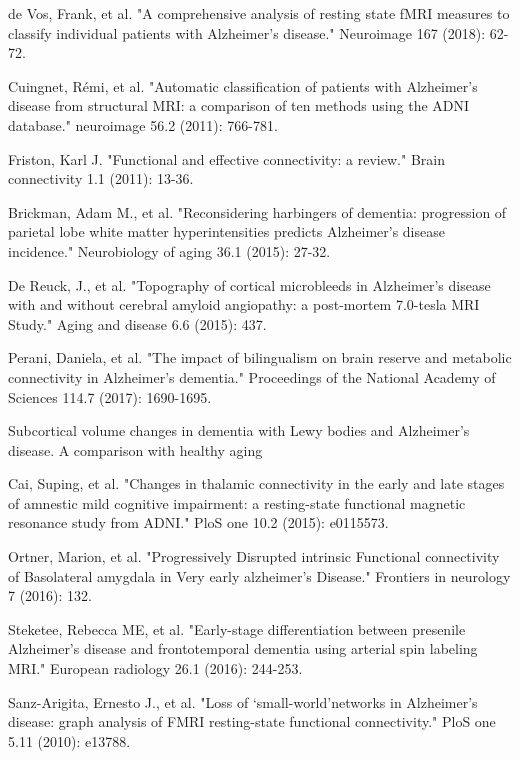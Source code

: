 \documentclass[preprint,12pt]{elsarticle}
\begin{document}
\begin{thebibliography}{1}
			de Vos, Frank, et al. "A comprehensive analysis of resting state fMRI measures to classify individual patients with Alzheimer's disease." Neuroimage 167 (2018): 62-72.
			
			Cuingnet, Rémi, et al. "Automatic classification of patients with Alzheimer's disease from structural MRI: a comparison of ten methods using the ADNI database." neuroimage 56.2 (2011): 766-781.
			
			Friston, Karl J. "Functional and effective connectivity: a review." Brain connectivity 1.1 (2011): 13-36.
			
			
			Brickman, Adam M., et al. "Reconsidering harbingers of dementia: progression of parietal lobe white matter hyperintensities predicts Alzheimer's disease incidence." Neurobiology of aging 36.1 (2015): 27-32.
			
			De Reuck, J., et al. "Topography of cortical microbleeds in Alzheimer’s disease with and without cerebral amyloid angiopathy: a post-mortem 7.0-tesla MRI Study." Aging and disease 6.6 (2015): 437.
			
			Perani, Daniela, et al. "The impact of bilingualism on brain reserve and metabolic connectivity in Alzheimer's dementia." Proceedings of the National Academy of Sciences 114.7 (2017): 1690-1695.
			
			Subcortical volume changes in dementia with Lewy bodies and Alzheimer's disease. A comparison with healthy aging
			
			Cai, Suping, et al. "Changes in thalamic connectivity in the early and late stages of amnestic mild cognitive impairment: a resting-state functional magnetic resonance study from ADNI." PloS one 10.2 (2015): e0115573.
			
			Ortner, Marion, et al. "Progressively Disrupted intrinsic Functional connectivity of Basolateral amygdala in Very early alzheimer’s Disease." Frontiers in neurology 7 (2016): 132.
			
			Steketee, Rebecca ME, et al. "Early-stage differentiation between presenile Alzheimer’s disease and frontotemporal dementia using arterial spin labeling MRI." European radiology 26.1 (2016): 244-253.
			
			Sanz-Arigita, Ernesto J., et al. "Loss of ‘small-world’networks in Alzheimer's disease: graph analysis of FMRI resting-state functional connectivity." PloS one 5.11 (2010): e13788.
			

\end{thebibliography}
\end{document}
